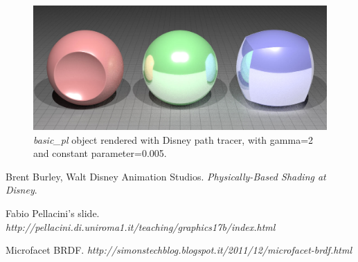 \documentclass[11pt]{article}
\begin{document}
\begin{figure}[H]
	\centering
	\includegraphics[scale=0.17]{img/obj/basic_pl/basic_pl_disney_dc005_dg2.jpg}
	\caption{\textit{basic\_pl} object rendered with Disney path tracer, with gamma=2 and constant parameter=0.005.}
	\label{fig:205}
\end{figure}

\begin{thebibliography}{9}
	Brent Burley, Walt Disney Animation Studios. 
	\textit{Physically-Based Shading at Disney}.
	
	Fabio Pellacini's slide. 
	\textit{http://pellacini.di.uniroma1.it/teaching/graphics17b/index.html}

	Microfacet BRDF. 
	\textit{http://simonstechblog.blogspot.it/2011/12/microfacet-brdf.html}	
\end{thebibliography}
\end{document}

